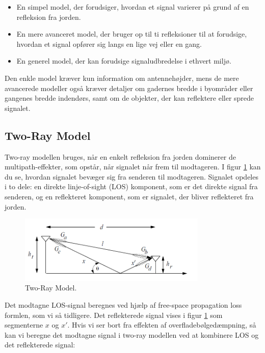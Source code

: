 \documentclass[a4paper,12pt]{book}
\begin{document}
	\begin{itemize}
		\item En simpel model, der forudsiger, hvordan et signal varierer på grund af en refleksion fra jorden.
		\item En mere avanceret model, der bruger op til ti refleksioner til at forudsige, hvordan et signal opfører sig langs en lige vej eller en gang.
		\item En generel model, der kan forudsige signaludbredelse i ethvert miljø.
	\end{itemize}
	Den enkle model kræver kun information om antennehøjder, mens de mere avancerede modeller også kræver detaljer om gadernes bredde i byområder eller gangenes bredde indendørs, samt om de objekter, der kan reflektere eller sprede signalet.
	
	\subsection{Two-Ray Model}
	
	\noindent Two-ray modellen bruges, når en enkelt refleksion fra jorden dominerer de multipath-effekter, som opstår, når signalet når frem til modtageren. I figur \ref{fig:two_ray_model} kan du se, hvordan signalet bevæger sig fra senderen til modtageren. Signalet opdeles i to dele: en direkte linje-of-sight (LOS) komponent, som er det direkte signal fra senderen, og en reflekteret komponent, som er signalet, der bliver reflekteret fra jorden.
	
	\begin{figure}[h]
		\centering
		\includegraphics[width=0.8\textwidth]{fig/fig4.png}
		\caption{Two-Ray Model.}
		\label{fig:two_ray_model}
	\end{figure}
	
	\noindent
	Det modtagne LOS-signal beregnes ved hjælp af free-space propagation loss formlen, som vi så tidligere. Det reflekterede signal vises i figur \ref{fig:two_ray_model} som segmenterne \(x\) og \(x'\). Hvis vi ser bort fra effekten af overfladebølgedæmpning, så kan vi beregne det modtagne signal i two-ray modellen ved at kombinere LOS og det reflekterede signal:
	
\end{document}
